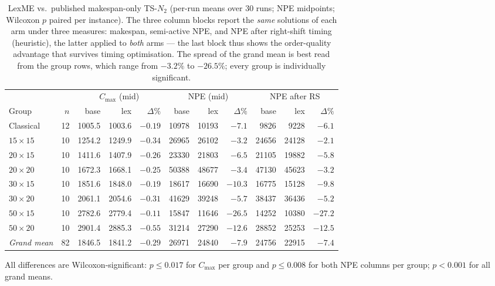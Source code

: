 \documentclass[preprint,12pt]{elsarticle}
\newcommand{\Cmax}{C_{\max}}
\begin{document}
\begin{table}[htb]
\centering\small
\caption{LexME vs.\ published makespan-only TS-$N_2$ (per-run means over
30 runs; NPE midpoints; Wilcoxon $p$ paired per instance). The three column
blocks report the \emph{same} solutions of each arm under three measures:
makespan, semi-active NPE, and NPE after right-shift timing (heuristic),
the latter applied to \emph{both} arms --- the last block thus shows the
order-quality advantage that survives timing optimisation. The spread of
the grand mean is best read from the group rows, which range from $-3.2\%$
to $-26.5\%$; every group is individually significant.}
\label{tab:lex}
\begin{tabular}{l r rrr rrr rrr}
\toprule
 & & \multicolumn{3}{c}{$\Cmax$ (mid)} & \multicolumn{3}{c}{NPE (mid)} &
 \multicolumn{3}{c}{NPE after RS} \\
\cmidrule(lr){3-5}\cmidrule(lr){6-8}\cmidrule(lr){9-11}
Group & $n$ & base & lex & $\Delta\%$ & base & lex & $\Delta\%$ & base & lex & $\Delta\%$ \\
\midrule
Classical & 12 & 1005.5 & 1003.6 & $-0.19$ & 10978 & 10193 & $\mathbf{-7.1}$ & 9826 & 9228 & $\mathbf{-6.1}$ \\
$15{\times}15$ & 10 & 1254.2 & 1249.9 & $-0.34$ & 26965 & 26102 & $-3.2$ & 24656 & 24128 & $-2.1$ \\
$20{\times}15$ & 10 & 1411.6 & 1407.9 & $-0.26$ & 23330 & 21803 & $-6.5$ & 21105 & 19882 & $-5.8$ \\
$20{\times}20$ & 10 & 1672.3 & 1668.1 & $-0.25$ & 50388 & 48677 & $-3.4$ & 47130 & 45623 & $-3.2$ \\
$30{\times}15$ & 10 & 1851.6 & 1848.0 & $-0.19$ & 18617 & 16690 & $-10.3$ & 16775 & 15128 & $-9.8$ \\
$30{\times}20$ & 10 & 2061.1 & 2054.6 & $-0.31$ & 41629 & 39248 & $-5.7$ & 38437 & 36436 & $-5.2$ \\
$50{\times}15$ & 10 & 2782.6 & 2779.4 & $-0.11$ & 15847 & 11646 & $\mathbf{-26.5}$ & 14252 & 10380 & $\mathbf{-27.2}$ \\
$50{\times}20$ & 10 & 2901.4 & 2885.3 & $-0.55$ & 31214 & 27290 & $-12.6$ & 28852 & 25253 & $-12.5$ \\
\midrule
\emph{Grand mean} & 82 & 1846.5 & 1841.2 & $-0.29$ & 26971 & 24840 & $\mathbf{-7.9}$ & 24756 & 22915 & $\mathbf{-7.4}$ \\
\bottomrule
\end{tabular}

\medskip
\footnotesize All differences are Wilcoxon-significant: $p\le 0.017$ for
$\Cmax$ per group and $p\le 0.008$ for both NPE columns per group;
$p<0.001$ for all grand means.
\end{table}
\end{document}
